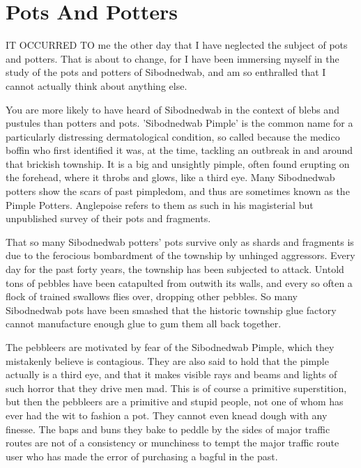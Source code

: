 \chapter{Pots And Potters}

IT OCCURRED TO me the other day that I have neglected the subject of pots and potters. That is about to change, for I have been immersing myself in the study of the pots and potters of Sibodnedwab, and am so enthralled that I cannot actually think about anything else.

You are more likely to have heard of Sibodnedwab in the context of blebs and pustules than potters and pots. 'Sibodnedwab Pimple' is the common name for a particularly distressing dermatological condition, so called because the medico boffin who first identified it was, at the time, tackling an outbreak in and around that brickish township. It is a big and unsightly pimple, often found erupting on the forehead, where it throbs and glows, like a third eye. Many Sibodnedwab potters show the scars of past pimpledom, and thus are sometimes known as the Pimple Potters. Anglepoise refers to them as such in his magisterial but unpublished survey of their pots and fragments.

That so many Sibodnedwab potters' pots survive only as shards and fragments is due to the ferocious bombardment of the township by unhinged aggressors. Every day for the past forty years, the township has been subjected to attack. Untold tons of pebbles have been catapulted from outwith its walls, and every so often a flock of trained swallows flies over, dropping other pebbles. So many Sibodnedwab pots have been smashed that the historic township glue factory cannot manufacture enough glue to gum them all back together.

The pebbleers are motivated by fear of the Sibodnedwab Pimple, which they mistakenly believe is contagious. They are also said to hold that the pimple actually is a third eye, and that it makes visible rays and beams and lights of such horror that they drive men mad. This is of course a primitive superstition, but then the pebbleers are a primitive and stupid people, not one of whom has ever had the wit to fashion a pot. They cannot even knead dough with any finesse. The baps and buns they bake to peddle by the sides of major traffic routes are not of a consistency or munchiness to tempt the major traffic route user who has made the error of purchasing a bagful in the past.

